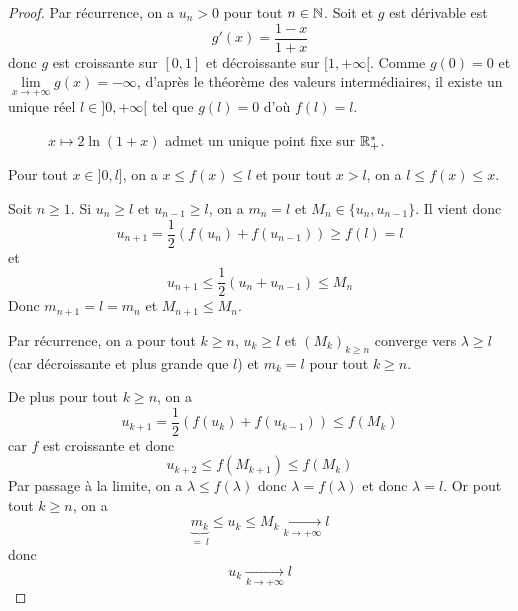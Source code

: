 \begin{proof}
	Par récurrence, on a $u_{n}>0$ pour tout $n\in\mathbb{N}$.
	Soit 
	et 
	$g$ est dérivable est 
	$$g'(x)=\frac{1-x}{1+x}$$
	donc $g$ est croissante sur $[0,1]$ et décroissante sur $[1,+\infty[$. Comme $g(0)=0$ et $\lim\limits_{x\to+\infty}g(x)=-\infty$, d'après le théorème des valeurs intermédiaires, il existe un unique réel $l\in]0,+\infty[$ tel que $g(l)=0$ d'où $f(l)=l$.

	\begin{figure}[ht!]
		\centering
		\caption{$x\mapsto 2\ln(1+x)$ admet un unique point fixe sur $\mathbb{R}_{+}^{*}$.}
	\end{figure}

	Pour tout $x\in]0,l]$, on a $x\leqslant f(x)\leqslant l$ et pour tout $x>l$, on a $l\leqslant f(x)\leqslant x$.

	Soit $n\geqslant1$. Si $u_{n}\geqslant l$ et $u_{n-1}\geqslant l$, on a $m_{n}=l$ et $M_{n}\in\{u_{n},u_{n-1}\}$. Il vient donc 
	$$u_{n+1}=\frac{1}{2}(f(u_{n})+f(u_{n-1}))\geqslant f(l)=l$$
	et 
	$$u_{n+1}\leqslant\frac{1}{2}(u_{n}+u_{n-1})\leqslant M_{n}$$
	Donc $m_{n+1}=l=m_{n}$ et $M_{n+1}\leqslant M_{n}$.

	Par récurrence, on a pour tout $k\geqslant n$, $u_{k}\geqslant l$ et $(M_{k})_{k\geqslant n}$ converge vers $\lambda\geqslant l$ (car décroissante et plus grande que $l$) et $m_{k}=l$ pour tout $k\geqslant n$.

	De plus pour tout $k\geqslant n$, on a 
	$$u_{k+1}=\frac{1}{2}(f(u_{k})+f(u_{k-1}))\leqslant f(M_{k})$$
	car $f$ est croissante et donc 
	$$u_{k+2}\leqslant f(M_{k+1})\leqslant f(M_{k})$$
	Par passage à la limite, on a $\lambda\leqslant f(\lambda)$ donc $\lambda=f(\lambda)$ et donc $\lambda=l$. Or pout tout $k\geqslant n$, on a 
	$$\underbrace{m_{k}}_{=~l}\leqslant u_{k}\leqslant M_{k}\xrightarrow[k\to+\infty]{}l$$
	donc 
	$$\boxed{u_{k}\xrightarrow[k\to+\infty]{}l}$$


\end{proof}
